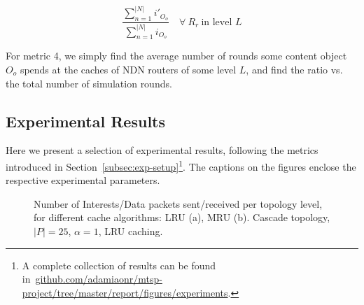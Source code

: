 \begin{equation}
    \frac{\sum_{n=1}^{|N|} i'_{O_o}}{\sum_{n=1}^{|N|} i_{O_o}} \quad \forall \ R_r \ \text{in level $L$}
    \label{eq:exp-setup-metrics-2}
\end{equation}\shortvertbreak

For metric 4, we simply find the average number of rounds 
some content object $O_o$ spends at the caches of NDN routers of some level $L$, and find 
the ratio vs. the total number of simulation rounds.

\subsection{Experimental Results}
\label{subsec:exp-results}

Here we present a selection of experimental results, following the metrics 
introduced in Section~\ref{subsec:exp-setup}\footnote{A complete collection of 
results can be found in~\url{github.com/adamiaonr/mtsp-project/tree/master/report/figures/experiments}.}. 
The captions on the figures enclose the respective experimental parameters.\shortvertbreak


\begin{figure}[h!]
    \centering



    \cprotect\caption{Number of Interests\slash Data packets sent\slash received 
        per topology level, for different cache algorithms: LRU (a), MRU (b). 
        Cascade topology, $|P| = 25$, $\alpha = 1$, LRU caching.}
    \label{fig:exp-results-topologies-cascade}

\end{figure}

